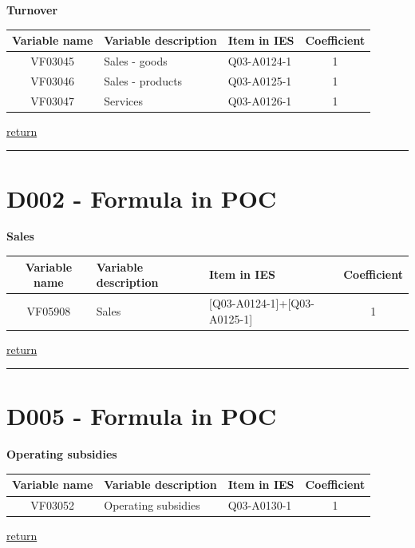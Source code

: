\documentclass[]{book}
\begin{document}
\textbf{Turnover}

\begin{longtable}[]{@{}cllc@{}}
\toprule
Variable name & Variable description & Item in IES & Coefficient\tabularnewline
\midrule
\endhead
VF03045 & Sales - goods & Q03-A0124-1 & 1\tabularnewline
VF03046 & Sales - products & Q03-A0125-1 & 1\tabularnewline
VF03047 & Services & Q03-A0126-1 & 1\tabularnewline
\bottomrule
\end{longtable}

\protect\hyperlink{b3.-profit-and-loss-statement-variables}{return}

\begin{center}\rule{0.5\linewidth}{\linethickness}\end{center}

\hypertarget{d002---formula-in-poc}{%
\section{D002 - Formula in POC}\label{d002---formula-in-poc}}

\textbf{Sales}

\begin{longtable}[]{@{}cllc@{}}
\toprule
Variable name & Variable description & Item in IES & Coefficient\tabularnewline
\midrule
\endhead
VF05908 & Sales & {[}Q03-A0124-1{]}+{[}Q03-A0125-1{]} & 1\tabularnewline
\bottomrule
\end{longtable}

\protect\hyperlink{b3.-profit-and-loss-statement-variables}{return}

\begin{center}\rule{0.5\linewidth}{\linethickness}\end{center}

\hypertarget{d005---formula-in-poc}{%
\section{D005 - Formula in POC}\label{d005---formula-in-poc}}

\textbf{Operating subsidies}

\begin{longtable}[]{@{}cllc@{}}
\toprule
Variable name & Variable description & Item in IES & Coefficient\tabularnewline
\midrule
\endhead
VF03052 & Operating subsidies & Q03-A0130-1 & 1\tabularnewline
\bottomrule
\end{longtable}

\protect\hyperlink{b3.-profit-and-loss-statement-variables}{return}
\end{document}

